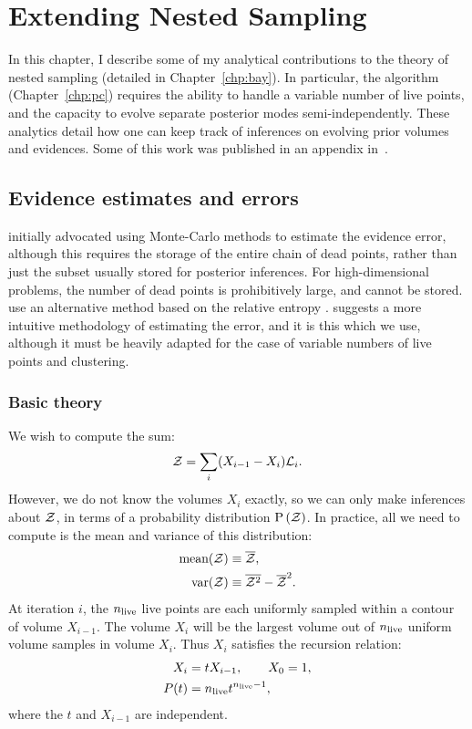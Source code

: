 \chapter{Extending Nested Sampling}
\label{chp:ens}

In this chapter, I describe some of my analytical contributions to the theory of nested sampling (detailed in Chapter~\ref{chp:bay}). In particular, the \PolyChord{} algorithm (Chapter~\ref{chp:pc}) requires the ability to handle a variable number of live points, and the capacity to evolve separate posterior modes semi-independently. These analytics detail how one can keep track of inferences on evolving prior volumes and evidences. 
Some of this work was published in an appendix in~\cite{polychordpaper}.

\section{Evidence estimates and errors}                            
\label{sec:ens:evidences}

\cite{skilling2006} initially advocated using Monte-Carlo methods to estimate the evidence error, although this requires the storage of the entire chain of dead points, rather than just the subset usually stored for posterior inferences. For high-dimensional problems, the number of dead points is prohibitively large, and cannot be stored.
\cite{MultiNest2} use an alternative method based on the relative entropy \citep[also suggested by][]{skilling2006}. 
\cite{Keeton} suggests a more intuitive methodology of estimating the error, and it is this which we use, although it must be heavily adapted for the case of variable numbers of live points and clustering.

\subsection{Basic theory}
\label{sec:ens:basic_theory}

We wish to compute the sum:
%
\begin{equation}
  \mathcal{Z} = \sum\limits_{i} (X_{i-1}-X_{i})\mathcal{L}_i.
  \label{eqn:ens:app_ev}
\end{equation}
%
However, we do not know the volumes \(X_i\) exactly, so we can only make inferences about \(\mathcal{Z}\), in terms of a probability distribution \(\mathrm{P}\left(\mathcal{Z}\right)\). In practice, all we need to compute is the mean and variance of this distribution:
\begin{align}
  \text{mean}(\mathcal{Z}) &\equiv \overline{\mathcal{Z}},\\
  \text{var}(\mathcal{Z}) &\equiv \overline{\mathcal{Z}^2}-\overline{\mathcal{Z}}^2.
\end{align}
%
At iteration \(i\), the \(n_{\mathrm{live}}\) live points are each uniformly sampled within a contour of volume \(X_{i-1}\). The volume \(X_i\) will be the largest volume out of \(n_{\mathrm{live}}\) uniform volume samples in volume \(X_i\).
Thus \(X_i\) satisfies the recursion relation:
%
\begin{align}
  X_i &= t X_{i-1}, \qquad X_0=1, \label{eqn:ens:rr_x} \\
  P(t) &= n_{\mathrm{live}} t^{n_{\mathrm{live}} - 1}, \label{eqn:ens:Pt}
\end{align}
%
where the \(t\) and \(X_{i-1}\) are independent.

